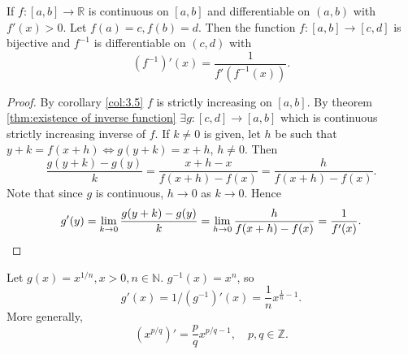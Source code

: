 \begin{theorem}\label{thm:Inverse function theorem}
    If $ f:[a,b]\to \mathbb{R}  $ is continuous on $[a,b]$ and differentiable on $ (a,b) $ with $ f'(x)>0 $. Let $f(a)=c,f(b)=d$. Then the function $ f:[a,b]\to [c,d] $ is bijective and $ f^{-1} $ is differentiable on $(c,d)$ with 
    \[
        (f^{-1})'(x)=\frac{1}{f'(f^{-1}(x))}.
    \]
\end{theorem}
\begin{proof}
    By corollary \ref{col:3.5} $f$ is strictly increasing on $[a,b]$. By theorem \ref{thm:existence of inverse function} $ \exists g:[c,d]\to [a,b] $ which is continuous strictly increasing inverse of $f$. If $k\neq 0$ is given, let $ h $ be such that $ y+k = f(x+h) \Leftrightarrow g(y+k)=x+h $, $ h\neq 0 $. Then 
    \[
        \frac{g(y+k)-g(y)}{k} = \frac{x+h-x}{f(x+h)-f(x)}= \frac{h}{f(x+h)-f(x)}.
    \]
    Note that since $g$ is continuous, $ h\to 0 $ as $ k\to 0 $. Hence
    \[
        g'(y) = \lim_{k \to 0} \frac{g(y+k)-g(y)}{k} = \lim_{h \to 0} \frac{h}{f(x+h)-f(x)} = \frac{1}{f'(x)}.\qedhere
    \]
\end{proof}
\begin{example}
    Let $ g(x)=x^{1/n},x>0,n\in \mathbb{N} $. $ g^{-1}(x)=x^{n} $, so
    \[
        g'(x) = 1/(g^{-1})'(x)=\frac{1}{n}x^{\frac{1}{n}-1}.
    \]
    More generally,
    \[
        \left( x^{p/q} \right)'=\frac{p}{q}x^{p/q-1},\quad p,q\in \mathbb{Z}.
    \]
\end{example}

